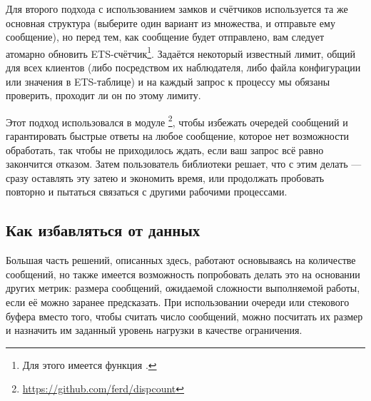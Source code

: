 \documentclass[11pt, oneside]{book}   	%
\begin{document}
Для второго подхода с использованием замков и счётчиков используется та же основная структура (выберите один вариант из множества, и отправьте ему сообщение), но перед тем, как сообщение будет отправлено, вам следует атомарно обновить ETS-счётчик\footnote{Для этого имеется функция .}. Задаётся некоторый известный лимит, общий для всех клиентов (либо посредством их наблюдателя, либо файла конфигурации или значения в ETS-таблице) и на каждый запрос к процессу мы обязаны проверить, проходит ли он по этому лимиту.

Этот подход использовался в модуле \footnote{\href{https://github.com/ferd/dispcount}{https://github.com/ferd/dispcount}}, чтобы избежать очередей сообщений и гарантировать быстрые ответы на любое сообщение, которое нет возможности обработать, так чтобы не приходилось ждать, если ваш запрос всё равно закончится отказом. Затем пользователь библиотеки решает, что с этим делать --- сразу оставлять эту затею и экономить время, или продолжать пробовать повторно и пытаться связаться с другими рабочими процессами.


\subsection{Как избавляться от данных}

Большая часть решений, описанных здесь, работают основываясь на количестве сообщений, но также имеется возможность попробовать делать это на основании других метрик: размера сообщений, ожидаемой сложности выполняемой работы, если её можно заранее предсказать. При использовании очереди или стекового буфера вместо того, чтобы считать число сообщений, можно посчитать их размер и назначить им заданный уровень нагрузки в качестве ограничения.
\end{document}
